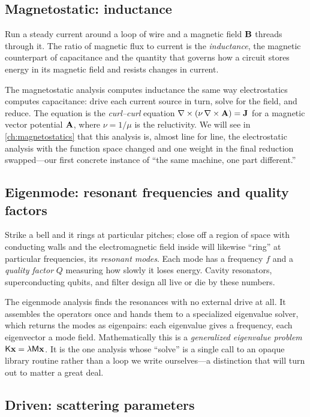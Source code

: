 \subsection{Magnetostatic: inductance}

Run a steady current around a loop of wire and a magnetic field $\mathbf{B}$ threads
through it. The ratio of magnetic flux to current is the \emph{inductance}, the
magnetic counterpart of capacitance and the quantity that governs how a circuit
stores energy in its magnetic field and resists changes in current.

The magnetostatic analysis computes inductance the same way electrostatics
computes capacitance: drive each current source in turn, solve for the field,
and reduce. The equation is the \emph{curl--curl} equation
$\nabla\times(\nu\,\nabla\times\mathbf{A})=\mathbf{J}$ for a magnetic vector potential $\mathbf{A}$, where
$\nu=1/\mu$ is the reluctivity. We will see in \cref{ch:magnetostatics} that
this analysis is, almost line for line, the electrostatic analysis with the
function space changed and one weight in the final reduction swapped---our first
concrete instance of ``the same machine, one part different.''

\subsection{Eigenmode: resonant frequencies and quality factors}

Strike a bell and it rings at particular pitches; close off a region of space
with conducting walls and the electromagnetic field inside will likewise
``ring'' at particular frequencies, its \emph{resonant modes}. Each mode has a
frequency $f$ and a \emph{quality factor} $Q$ measuring how slowly it loses
energy. Cavity resonators, superconducting qubits, and filter design all live
or die by these numbers.

The eigenmode analysis finds the resonances with no external drive at all. It
assembles the operators once and hands them to a specialized eigenvalue solver,
which returns the modes as eigenpairs: each eigenvalue gives a frequency, each
eigenvector a mode field. Mathematically this is a \emph{generalized eigenvalue
problem} $\mathsf{K}\mathbf{x}=\lambda\mathsf{M}\mathbf{x}$. It is the one analysis whose ``solve''
is a single call to an opaque library routine rather than a loop we write
ourselves---a distinction that will turn out to matter a great deal.

\subsection{Driven: scattering parameters}

